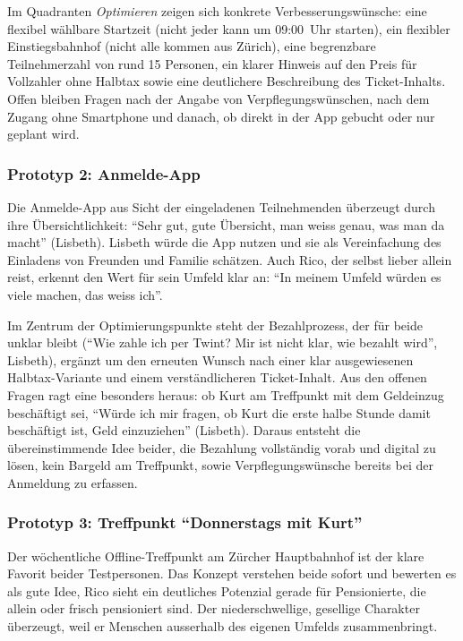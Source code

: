 Im Quadranten \emph{Optimieren} zeigen sich konkrete Verbesserungswünsche: eine flexibel wählbare Startzeit (nicht jeder kann um 09:00~Uhr starten), ein flexibler Einstiegsbahnhof (nicht alle kommen aus Zürich), eine begrenzbare Teilnehmerzahl von rund 15 Personen, ein klarer Hinweis auf den Preis für Vollzahler ohne Halbtax sowie eine deutlichere Beschreibung des Ticket-Inhalts. Offen bleiben Fragen nach der Angabe von Verpflegungswünschen, nach dem Zugang ohne Smartphone und danach, ob direkt in der App gebucht oder nur geplant wird.

\subsubsection{Prototyp 2: Anmelde-App}
Die Anmelde-App aus Sicht der eingeladenen Teilnehmenden überzeugt durch ihre Übersichtlichkeit: \enquote{Sehr gut, gute Übersicht, man weiss genau, was man da macht} (Lisbeth). Lisbeth würde die App nutzen und sie als Vereinfachung des Einladens von Freunden und Familie schätzen. Auch Rico, der selbst lieber allein reist, erkennt den Wert für sein Umfeld klar an: \enquote{In meinem Umfeld würden es viele machen, das weiss ich}.

Im Zentrum der Optimierungspunkte steht der Bezahlprozess, der für beide unklar bleibt (\enquote{Wie zahle ich per Twint? Mir ist nicht klar, wie bezahlt wird}, Lisbeth), ergänzt um den erneuten Wunsch nach einer klar ausgewiesenen Halbtax-Variante und einem verständlicheren Ticket-Inhalt. Aus den offenen Fragen ragt eine besonders heraus: ob Kurt am Treffpunkt mit dem Geldeinzug beschäftigt sei, \enquote{Würde ich mir fragen, ob Kurt die erste halbe Stunde damit beschäftigt ist, Geld einzuziehen} (Lisbeth). Daraus entsteht die übereinstimmende Idee beider, die Bezahlung vollständig vorab und digital zu lösen, kein Bargeld am Treffpunkt, sowie Verpflegungswünsche bereits bei der Anmeldung zu erfassen.

\subsubsection{Prototyp 3: Treffpunkt \enquote{Donnerstags mit Kurt}}
Der wöchentliche Offline-Treffpunkt am Zürcher Hauptbahnhof ist der klare Favorit beider Testpersonen. Das Konzept verstehen beide sofort und bewerten es als gute Idee, Rico sieht ein deutliches Potenzial gerade für Pensionierte, die allein oder frisch pensioniert sind. Der niederschwellige, gesellige Charakter überzeugt, weil er Menschen ausserhalb des eigenen Umfelds zusammenbringt.

